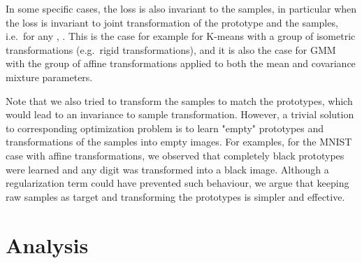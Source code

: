 \documentclass{article}
\begin{document}
In some specific cases, the loss is also invariant to the samples, in particular when the 
loss  is invariant to joint transformation of the prototype and the samples, i.e.\ for
any , . This is the case for example for K-means with a group of isometric 
transformations (e.g.\ rigid transformations), and it is also the case for GMM with the group 
of affine transformations applied to both the mean and covariance mixture parameters.

Note that we also tried to transform the samples to match the prototypes, which would lead to 
an invariance to sample transformation. However, a trivial solution to corresponding 
optimization problem is to learn "empty" prototypes and transformations of the samples into 
empty images. For examples, for the MNIST case with affine transformations, we observed that 
completely black prototypes were learned and any digit was transformed into a black image.  
Although a regularization term could have prevented such behaviour, we argue that keeping raw 
samples as target and transforming the prototypes is simpler and effective.


\section{Analysis}\label{sec:analysis}
\end{document}

